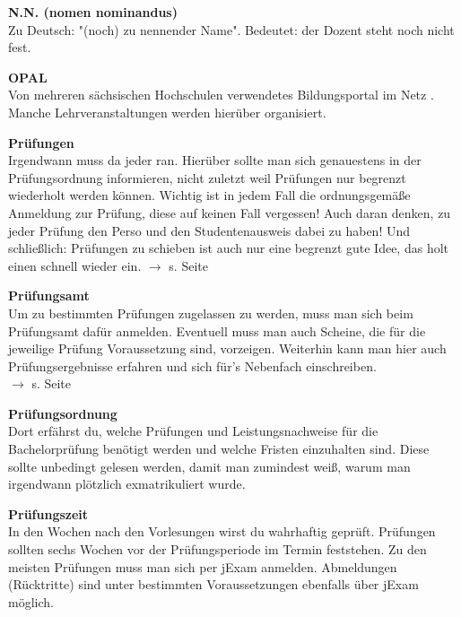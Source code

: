 \begin{multicols}{2}

\textbf{N.N. (nomen nominandus)} \\
Zu Deutsch:
"(noch) zu nennender Name".
Bedeutet:
der Dozent steht noch nicht fest.

\textbf{OPAL}\\
Von mehreren sächsischen Hochschulen verwendetes Bildungsportal im Netz .
Manche Lehrveranstaltungen werden hierüber organisiert.

\textbf{Prüfungen} \\
Irgendwann muss da jeder ran.
Hierüber sollte man sich genauestens in der Prüfungsordnung informieren, nicht zuletzt weil Prüfungen nur begrenzt wiederholt werden können.
Wichtig ist in jedem Fall die ordnungsgemäße Anmeldung zur Prüfung, diese auf keinen Fall vergessen!
Auch daran denken, zu jeder Prüfung den Perso und den Studentenausweis dabei zu haben!
Und schließlich: Prüfungen zu schieben ist auch nur eine begrenzt gute Idee, das holt einen schnell wieder ein.
$\rightarrow$ s. Seite \pageref{sec:pruefungen}

\textbf{Prüfungsamt} \\
Um zu bestimmten Prüfungen zugelassen zu werden, muss man sich beim Prüfungsamt dafür anmelden.
Eventuell muss man auch Scheine, die für die jeweilige Prüfung Voraussetzung sind, vorzeigen.
Weiterhin kann man hier auch Prüfungsergebnisse erfahren und sich für's Nebenfach einschreiben. \\
$\rightarrow$ s. Seite \pageref{sec:pruefungsamt}

\textbf{Prüfungsordnung} \\
Dort erfährst du, welche Prüfungen und Leistungsnachweise für die Bachelorprüfung benötigt werden und welche Fristen einzuhalten sind.
Diese sollte unbedingt gelesen werden, damit man zumindest weiß, warum man irgendwann plötzlich exmatrikuliert wurde.

\textbf{Prüfungszeit} \\
In den Wochen nach den Vorlesungen wirst du wahrhaftig geprüft.
Prüfungen sollten sechs Wochen vor der Prüfungsperiode im Termin feststehen.
Zu den meisten Prüfungen muss man sich per jExam anmelden.
Abmeldungen (Rücktritte) sind unter bestimmten Voraussetzungen ebenfalls über jExam möglich.


\end{multicols}
